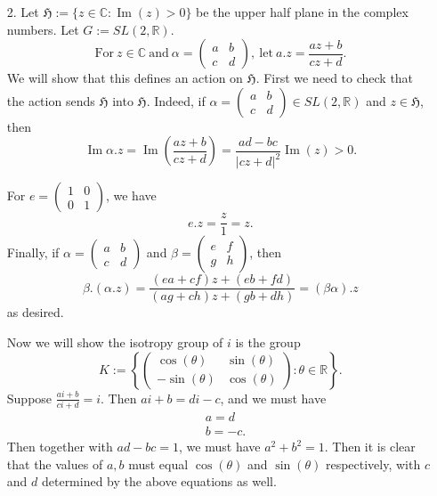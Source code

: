 \documentclass[11pt, reqno]{article}
\theoremstyle{plain}
\theoremstyle{definition}
\theoremstyle{remark}
\newcommand{\RR}{\mathbb{R}}
\newcommand{\CC}{\mathbb{C}}
\begin{document}
\begin{enumerate}
    \item[2.] Let $\mathfrak{H} := \{z \in \CC: \operatorname{Im}(z) > 0\}$ be the upper half plane 
    in the complex numbers. Let $G := SL(2, \RR)$. 
    \[
        \text{For}\ z \in \CC\ \text{and}\ \alpha = \begin{pmatrix} a & b \\ c & d \end{pmatrix},\ 
        \text{let}\ a.z = \frac{az + b}{cz + d}.
    \]
    We will show that this defines an action on $\mathfrak{H}$. First we need to check that 
    the action sends $\mathfrak{H}$ into $\mathfrak{H}$. Indeed, if $\alpha = \left(\begin{smallmatrix}
        a & b \\ c & d
    \end{smallmatrix}\right) \in SL(2, \RR)$ and $z \in \mathfrak{H}$, then 
    \[
        \operatorname{Im}\alpha. z = \operatorname{Im}\left(\frac{az + b}{cz + d}\right) = \frac{ad - bc}{|cz + d|^2}\operatorname{Im}(z) > 0.
    \]
    
    For $e = \begin{pmatrix}
        1 & 0 \\ 0 & 1
    \end{pmatrix}$, we have 
    \[
        e.z = \frac{z}{1} = z.
    \]
    Finally, if $\alpha = \left(\begin{smallmatrix}
            a & b \\ c & d
        \end{smallmatrix}\right)$ and $\beta = \left(\begin{smallmatrix}
            e & f \\ g & h
        \end{smallmatrix}\right)$,
    then 
    \[
        \beta .(\alpha . z) = \frac{(ea + cf)z + (eb + fd)}{(ag + ch)z + (gb + dh)} = (\beta\alpha).z
    \]
    as desired.

    Now we will show the isotropy group of $i$ is the group 
    \[
        K := \left\{\begin{pmatrix}
            \cos(\theta) & \sin(\theta) \\
            -\sin(\theta) & \cos(\theta)
        \end{pmatrix}: \theta \in \RR\right\}.
    \]
    Suppose $\frac{ai + b}{ci + d} = i$. Then $ai + b = di - c$, and we must have 
    \begin{align*}
        &a = d\\
        &b = -c.
    \end{align*}
    Then together with $ad - bc = 1$, we must have $a^2 + b^2 = 1$. Then it is clear that the values of 
    $a, b$ must equal $\cos(\theta)$ and $\sin(\theta)$ respectively, with $c$ and $d$ determined by 
    the above equations as well.


\end{enumerate}
\end{document}
